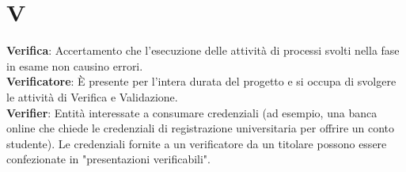 \section{V}
\textbf{Verifica}: Accertamento che l’esecuzione delle attività di processi svolti nella fase in esame non causino errori.\\
\textbf{Verificatore}: È presente per l'intera durata del progetto e si occupa di svolgere le attività di Verifica e Validazione.\\
\textbf{Verifier}: Entità interessate a consumare credenziali (ad esempio, una banca online che chiede le credenziali di registrazione universitaria per offrire un conto studente). Le credenziali fornite a un verificatore da un titolare possono essere confezionate in "presentazioni verificabili".\\